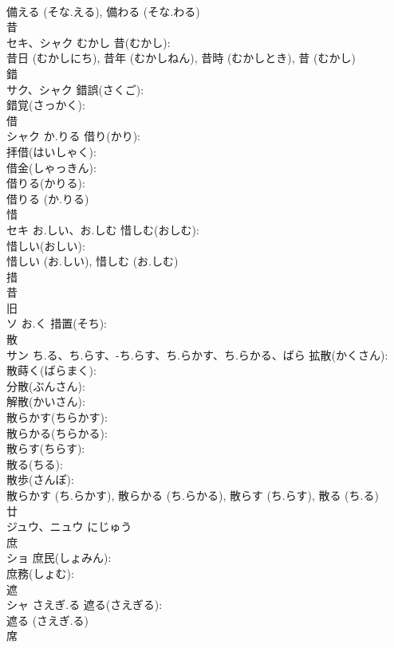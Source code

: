 \documentclass[8pt]{extreport}
\begin{document}
\begin{CJK}{UTF8}{min}
\\	備える (そな.える), 備わる (そな.わる)
\\	昔			
\\	セキ、シャク	むかし	昔(むかし): 
\\	昔日 (むかしにち), 昔年 (むかしねん), 昔時 (むかしとき), 昔 (むかし)
\\	錯			
\\	サク、シャク		錯誤(さくご): 
\\	錯覚(さっかく): 
\\	借			
\\	シャク	か.りる	借り(かり): 
\\	拝借(はいしゃく): 
\\	借金(しゃっきん): 
\\	借りる(かりる): 
\\	借りる (か.りる)
\\	惜			
\\	セキ	お.しい、お.しむ	惜しむ(おしむ): 
\\	惜しい(おしい): 
\\	惜しい (お.しい), 惜しむ (お.しむ)
\\	措			
\\	昔 
\\	旧 
\\	ソ	お.く	措置(そち): 
\\	散			
\\	サン	ち.る、ち.らす、-ち.らす、ち.らかす、ち.らかる、ばら	拡散(かくさん): 
\\	散蒔く(ばらまく): 
\\	分散(ぶんさん): 
\\	解散(かいさん): 
\\	散らかす(ちらかす): 
\\	散らかる(ちらかる): 
\\	散らす(ちらす): 
\\	散る(ちる): 
\\	散歩(さんぽ): 
\\	散らかす (ち.らかす), 散らかる (ち.らかる), 散らす (ち.らす), 散る (ち.る)
\\	廿			
\\	ジュウ、ニュウ	にじゅう		
\\	庶			
\\	ショ		庶民(しょみん): 
\\	庶務(しょむ): 
\\	遮			
\\	シャ	さえぎ.る	遮る(さえぎる): 
\\	遮る (さえぎ.る)
\\	席			

\end{CJK}
\end{document}
